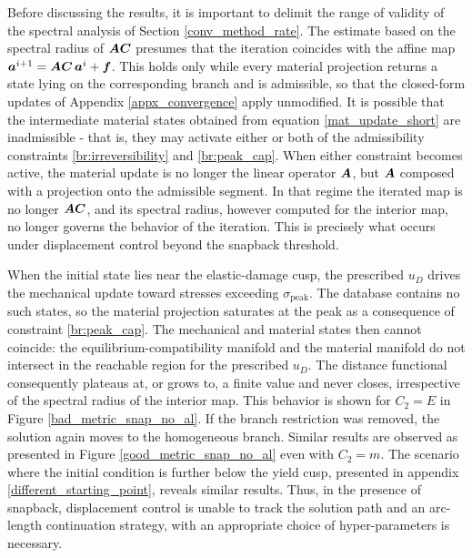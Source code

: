 \documentclass[10pt]{cas-sc}
\newcommand{\deleted}[1]{}
\newcommand{\added}[1]{#1}
\begin{document}
Before discussing the results, it is important to delimit the range of validity of the spectral analysis of Section \ref{conv_method_rate}. The \deleted{contraction} estimate based on the spectral radius of $\mbox{\boldmath $A$}\mbox{\boldmath $C$}$ presumes that the iteration coincides with the affine map $\mbox{\boldmath $a$}^{i+1} = \mbox{\boldmath $A$}\mbox{\boldmath $C$}\,\mbox{\boldmath $a$}^{i} + \mbox{\boldmath $f$}$. This holds only while every material projection returns a state lying on the corresponding branch and is admissible, so that the closed-form updates of Appendix \ref{appx_convergence} apply unmodified. It is possible that the intermediate material states obtained from equation \eqref{mat_update_short} are inadmissible - that is, they may \deleted{either be such that the resulting stress state $\sigst$ is larger than the peak stress or that the strain state $\epsst$ for the damage branch is smaller than the strain from the previous time step. The physical database, however, carries no stress above the peak $\sigma_{\mathrm{peak}}$, and, by irreversibility, the material state of a damaged element cannot retreat to a damage level below that already attained} \added{activate either or both of the admissibility constraints \ref{br:irreversibility} and \ref{br:peak_cap}}. When either \added{constraint}\deleted{bound} becomes active, the material update is no longer the linear operator $\mbox{\boldmath $A$}$, but $\mbox{\boldmath $A$}$ composed with a projection onto the admissible segment. In that regime the iterated map is no longer $\mbox{\boldmath $A$}\mbox{\boldmath $C$}$, and its spectral radius, however computed for the interior map, no longer governs the behavior of the iteration. This is precisely what occurs under displacement control beyond the snapback threshold. 

When the initial state lies near the elastic-damage cusp, the prescribed $u_D$ drives the mechanical update toward stresses exceeding $\sigma_{\mathrm{peak}}$. The database contains no such states, so the material projection saturates at the peak \added{as a consequence of constraint \ref{br:peak_cap}}. The mechanical and material states then cannot coincide: the equilibrium-compatibility manifold and the material manifold do not intersect in the reachable region for the prescribed $u_D$. The distance functional consequently plateaus at, or grows to, a finite value and never closes, irrespective of the spectral radius of the interior map. This behavior is shown for $C_2 = E$ in Figure \ref{bad_metric_snap_no_al}. If the branch restriction was removed, the solution again moves to the homogeneous branch. \added{Similar results are observed as presented in Figure \ref{good_metric_snap_no_al} even with $C_2=m$. The scenario  where the initial condition is further below the yield cusp, presented in appendix \ref{different_starting_point}, reveals similar results. Thus, in the presence of snapback, displacement control is unable to track the solution path and an arc-length continuation strategy, with an appropriate choice of hyper-parameters is necessary. }
\end{document}
